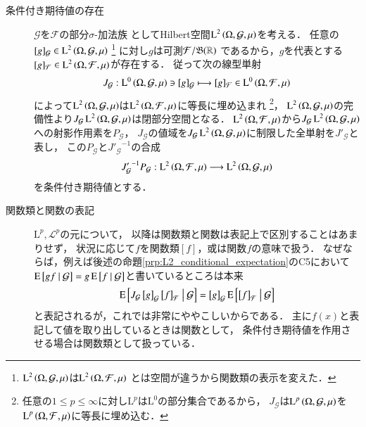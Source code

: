 \begin{description}
	\item[条件付き期待値の存在]
		$\mathcal{G}$を$\mathcal{F}$の部分$\sigma$-加法族
		としてHilbert空間$\operatorname{L}^{2} \left(\Omega, \mathcal{G},\mu\right)$を考える．
		任意の$[g]_{\mathcal{G}} \in \operatorname{L}^{2} \left(\Omega, \mathcal{G},\mu\right)$
		\footnote{
			$\operatorname{L}^{2} \left(\Omega, \mathcal{G},\mu\right)$は$\operatorname{L}^{2} \left(\Omega, \mathcal{F},\mu\right)$
			とは空間が違うから関数類の表示を変えた．
		}
		に対し$g$は可測$\mathcal{F}/\mathfrak{B}(\mathbb{R})$
		であるから，$g$を代表とする$[g]_{\mathcal{F}} \in \operatorname{L}^{2} \left(\Omega, \mathcal{F},\mu\right)$が存在する．
		従って次の線型単射
		\begin{align}
			J_{\mathcal{G}}:\operatorname{L}^{0} \left(\Omega, \mathcal{G},\mu\right) \ni [g]_{\mathcal{G}} \longmapsto [g]_{\mathcal{F}} \in \operatorname{L}^{0} \left(\Omega, \mathcal{F},\mu\right)
			\label{eq:Lp_sp_embedding}
		\end{align}
		によって$\operatorname{L}^{2} \left(\Omega, \mathcal{G},\mu\right)$は$\operatorname{L}^{2} \left(\Omega, \mathcal{F},\mu\right)$に等長に埋め込まれ
		\footnote{
			任意の$1 \leq p \leq \infty$に対し$\mathrm{L}^{p}$は$\mathrm{L}^{0}$の部分集合であるから，
			$J_{\mathcal{G}}$は$\operatorname{L}^{p} \left(\Omega, \mathcal{G},\mu\right)$を$\operatorname{L}^{p} \left(\Omega, \mathcal{F},\mu\right)$に等長に埋め込む．
		}，
		$\operatorname{L}^{2} \left(\Omega, \mathcal{G},\mu\right)$の完備性より$J_{\mathcal{G}} \operatorname{L}^{2} \left(\Omega, \mathcal{G},\mu\right)$は閉部分空間となる．
		$\operatorname{L}^{2} \left(\Omega, \mathcal{F},\mu\right)$から$J_{\mathcal{G}} \operatorname{L}^{2} \left(\Omega, \mathcal{G},\mu\right)$への射影作用素を$P_\mathcal{G}$，
		$J_{\mathcal{G}}$の値域を$J_{\mathcal{G}} \operatorname{L}^{2} \left(\Omega, \mathcal{G},\mu\right)$に制限した全単射を$J'_{\mathcal{G}}$と表し，
		この$P_{\mathcal{G}}$と${J'_{\mathcal{G}}}^{-1}$の合成
		\begin{align}
			{J'_{\mathcal{G}}}^{-1} P_{\mathcal{G}}:\operatorname{L}^{2} \left(\Omega, \mathcal{F},\mu\right) \longrightarrow \operatorname{L}^{2} \left(\Omega, \mathcal{G},\mu\right)
			\label{eq:composition_L2_conditional_expectation}
		\end{align}
		を条件付き期待値とする．
		
	\item[関数類と関数の表記]
		$\mathrm{L}^p,\mathscr{L}^p$の元について，
		以降は関数類と関数は表記上で区別することはあまりせず，
		状況に応じて$f$を関数類$[f]$，或は関数$f$の意味で扱う．
		なぜならば，例えば後述の命題\ref{prp:L2_conditional_expectation}のC5において
		$\operatorname{E} \left[ gf \ \middle|\ \mathcal{G} \right] = g\operatorname{E} \left[ f \ \middle|\ \mathcal{G} \right]$と書いているところは本来
		\begin{align}
			\operatorname{E} \left[ J_{\mathcal{G}}\left[g\right]_{\mathcal{G}}\left[f\right]_{\mathcal{F}} \ \middle|\ \mathcal{G} \right] 
			= \left[g\right]_{\mathcal{G}}\operatorname{E} \left[ \left[f\right]_{\mathcal{F}} \ \middle|\ \mathcal{G} \right]
		\end{align}
		と表記されるが，これでは非常にややこしいからである．
		主に$f(x)$と表記して値を取り出しているときは関数として，
		条件付き期待値を作用させる場合は関数類として扱っている．
	\end{description}
	
